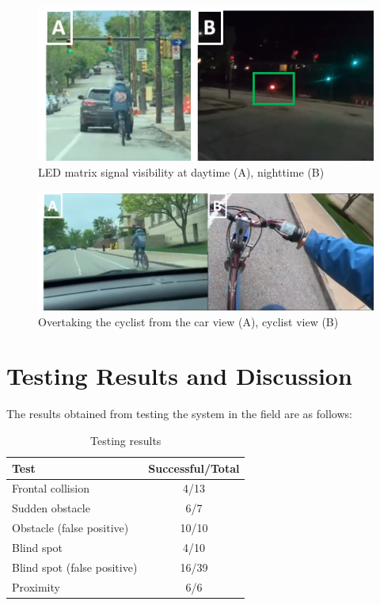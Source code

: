 \documentclass[journal]{IEEEtran}
\begin{document}
\begin{figure}
    \centering
    \includegraphics[width=\columnwidth]{images/visibility.png}
    \caption{LED matrix signal visibility at daytime (A), nighttime (B)}
    \label{fig:visibility}
\end{figure}

\begin{figure}
    \centering
    \includegraphics[width=\columnwidth]{images/side_by.png}
    \caption{Overtaking the cyclist from the car view (A), cyclist view (B)}
    \label{fig:overtake}
\end{figure}

\section{Testing Results and Discussion}
The results obtained from testing the system in the field are as follows:

\begin{table}[H]
    \centering
    \begin{tabularx}{0.8\columnwidth}{|X|c|}
        \hline
        \textbf{Test} & \textbf{Successful/Total} \\ \hline
        Frontal collision & 4/13 \\ \hline
        Sudden obstacle & 6/7 \\ \hline
        Obstacle (false positive) & 10/10 \\ \hline
        Blind spot & 4/10 \\ \hline
        Blind spot (false positive) & 16/39 \\ \hline
        Proximity & 6/6 \\ \hline
    \end{tabularx}
    \vspace{6pt}
    \caption{Testing results}
    \label{table-results}
\end{table}
\end{document}
